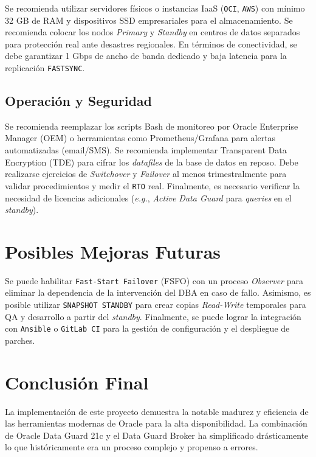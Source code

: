 \documentclass[11pt, a4paper]{report}
\begin{document}
Se recomienda utilizar servidores físicos o instancias IaaS (\texttt{OCI}, \texttt{AWS}) con mínimo 32 GB de RAM y dispositivos SSD empresariales para el almacenamiento. Se recomienda colocar los nodos \textit{Primary} y \textit{Standby} en centros de datos separados para protección real ante desastres regionales. En términos de conectividad, se debe garantizar 1 Gbps de ancho de banda dedicado y baja latencia para la replicación \texttt{FASTSYNC}.

\subsection{Operación y Seguridad}

Se recomienda reemplazar los scripts Bash de monitoreo por Oracle Enterprise Manager (OEM) o herramientas como Prometheus/Grafana para alertas automatizadas (email/SMS). Se recomienda implementar Transparent Data Encryption (TDE) para cifrar los \textit{datafiles} de la base de datos en reposo. Debe realizarse ejercicios de \textit{Switchover} y \textit{Failover} al menos trimestralmente para validar procedimientos y medir el \texttt{RTO} real. Finalmente, es necesario verificar la necesidad de licencias adicionales (\textit{e.g.}, \textit{Active Data Guard} para \textit{queries} en el \textit{standby}).

\section{Posibles Mejoras Futuras}

Se puede habilitar \texttt{Fast-Start Failover} (FSFO) con un proceso \textit{Observer} para eliminar la dependencia de la intervención del DBA en caso de fallo. Asimismo, es posible utilizar \texttt{SNAPSHOT STANDBY} para crear copias \textit{Read-Write} temporales para QA y desarrollo a partir del \textit{standby}. Finalmente, se puede lograr la integración con \texttt{Ansible} o \texttt{GitLab CI} para la gestión de configuración y el despliegue de parches.

\section{Conclusión Final}

La implementación de este proyecto demuestra la notable madurez y eficiencia de las herramientas modernas de Oracle para la alta disponibilidad. La combinación de Oracle Data Guard 21c y el Data Guard Broker ha simplificado drásticamente lo que históricamente era un proceso complejo y propenso a errores.
\end{document}
